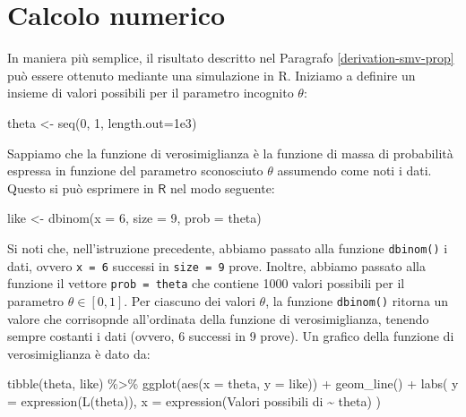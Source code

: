\documentclass[
  10pt,
  italian,
  a4paper,
  extrafontsizes,onecolumn,openright
  ]{memoir}
\newenvironment{Shaded}{\begin{snugshade}}{\end{snugshade}}
\newcommand{\AttributeTok}[1]{\textcolor[rgb]{0.77,0.63,0.00}{#1}}
\newcommand{\DecValTok}[1]{\textcolor[rgb]{0.00,0.00,0.81}{#1}}
\newcommand{\FloatTok}[1]{\textcolor[rgb]{0.00,0.00,0.81}{#1}}
\newcommand{\FunctionTok}[1]{\textcolor[rgb]{0.00,0.00,0.00}{#1}}
\newcommand{\NormalTok}[1]{#1}
\newcommand{\OtherTok}[1]{\textcolor[rgb]{0.56,0.35,0.01}{#1}}
\newcommand{\SpecialCharTok}[1]{\textcolor[rgb]{0.00,0.00,0.00}{#1}}
\newcommand{\StringTok}[1]{\textcolor[rgb]{0.31,0.60,0.02}{#1}}
\newcommand{\R}{\textsf{R}} %
\theoremstyle{definition}
\theoremstyle{definition}
\theoremstyle{definition}
\theoremstyle{definition}
\theoremstyle{remark}
\begin{document}
\hypertarget{calcolo-numerico}{%
\section*{Calcolo numerico}\label{calcolo-numerico}}

In maniera più semplice, il risultato descritto nel Paragrafo \ref{derivation-smv-prop} può essere ottenuto mediante una simulazione in \R. Iniziamo a definire un insieme di valori possibili per il parametro incognito \(\theta\):

\begin{Shaded}
\begin{Highlighting}[]
\NormalTok{theta }\OtherTok{\textless{}{-}} \FunctionTok{seq}\NormalTok{(}\DecValTok{0}\NormalTok{, }\DecValTok{1}\NormalTok{, }\AttributeTok{length.out=}\FloatTok{1e3}\NormalTok{)}
\end{Highlighting}
\end{Shaded}

Sappiamo che la funzione di verosimiglianza è la funzione di massa di probabilità espressa in funzione del parametro sconosciuto \(\theta\) assumendo come noti i dati. Questo si può esprimere in \(\R\) nel modo seguente:

\begin{Shaded}
\begin{Highlighting}[]
\NormalTok{like }\OtherTok{\textless{}{-}} \FunctionTok{dbinom}\NormalTok{(}\AttributeTok{x =} \DecValTok{6}\NormalTok{, }\AttributeTok{size =} \DecValTok{9}\NormalTok{, }\AttributeTok{prob =}\NormalTok{ theta)}
\end{Highlighting}
\end{Shaded}

Si noti che, nell'istruzione precedente, abbiamo passato alla funzione \texttt{dbinom()} i dati, ovvero \texttt{x\ =\ 6} successi in \texttt{size\ =\ 9} prove. Inoltre, abbiamo passato alla funzione il vettore \texttt{prob\ =\ theta} che contiene 1000 valori possibili per il parametro \(\theta \in [0, 1]\). Per ciascuno dei valori \(\theta\), la funzione \texttt{dbinom()} ritorna un valore che corrisopnde all'ordinata della funzione di verosimiglianza, tenendo sempre costanti i dati (ovvero, 6 successi in 9 prove). Un grafico della funzione di verosimiglianza è dato da:

\begin{Shaded}
\begin{Highlighting}[]
\FunctionTok{tibble}\NormalTok{(theta, like) }\SpecialCharTok{\%\textgreater{}\%} 
  \FunctionTok{ggplot}\NormalTok{(}\FunctionTok{aes}\NormalTok{(}\AttributeTok{x =}\NormalTok{ theta, }\AttributeTok{y =}\NormalTok{ like)) }\SpecialCharTok{+}
  \FunctionTok{geom\_line}\NormalTok{() }\SpecialCharTok{+}
  \FunctionTok{labs}\NormalTok{(}
    \AttributeTok{y =} \FunctionTok{expression}\NormalTok{(}\FunctionTok{L}\NormalTok{(theta)),}
    \AttributeTok{x =} \FunctionTok{expression}\NormalTok{(}\StringTok{\textquotesingle{}Valori possibili di\textquotesingle{}} \SpecialCharTok{\textasciitilde{}}\NormalTok{ theta)}
\NormalTok{  )}
\end{Highlighting}
\end{Shaded}
\end{document}
